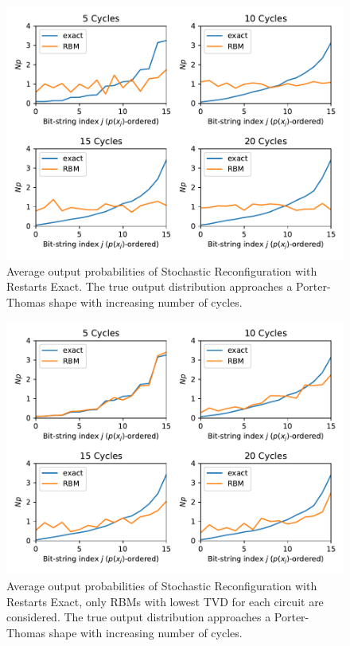 \begin{figure}[H]
  \centering
  \includegraphics[width=\textwidth]{figures/results/SR-restarts-not-learned/avgPDF.pdf}
  \caption[Average output probabilities of Stochastic Reconfiguration with Restarts Exact]{
    Average output probabilities of Stochastic Reconfiguration with Restarts Exact. The true 
    output distribution approaches a Porter-Thomas shape with increasing number of cycles.}
  \label{fig:sr_tvd}
\end{figure}

\begin{figure}[H]
  \centering
  \includegraphics[width=\textwidth]{figures/results/SR-restarts-not-learned/avgBestPDF.pdf}
  \caption[Averaged best performing output probabilities of Stochastic Reconfiguration with Restarts Exact]{
    Average output probabilities of Stochastic Reconfiguration with Restarts Exact, only RBMs with lowest
    TVD for each circuit are considered. The true 
    output distribution approaches a Porter-Thomas shape with increasing number of cycles.}
  \label{fig:sr_tvd}
\end{figure}

